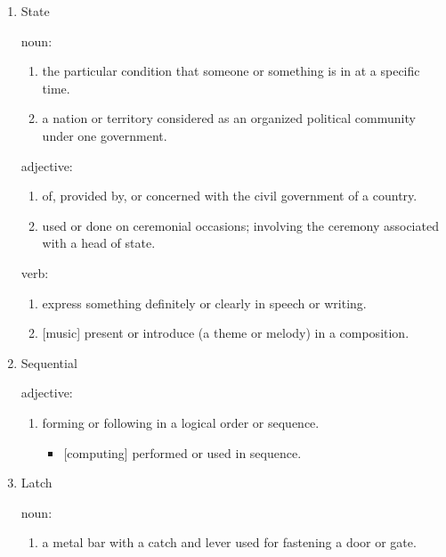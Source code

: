 \documentclass[12pt]{article}
\begin{document}
\begin{enumerate}
  \item State

  noun:

  \begin{enumerate}
    \item the particular condition that someone or something is in at a specific time.
    \item a nation or territory considered as an organized political community under one government.
  \end{enumerate}

  adjective:

  \begin{enumerate}
    \item of, provided by, or concerned with the civil government of a country.
    \item used or done on ceremonial occasions; involving the ceremony associated with a head of state.
  \end{enumerate}

  verb:

  \begin{enumerate}
    \item express something definitely or clearly in speech or writing.
    \item {[music]} present or introduce (a theme or melody) in a composition.
  \end{enumerate}

  \item Sequential

  adjective:

  \begin{enumerate}
    \item forming or following in a logical order or sequence.

    \begin{itemize}
      \item {[computing]} performed or used in sequence.
    \end{itemize}
  \end{enumerate}

  \item{Latch}

  noun:

  \begin{enumerate}
    \item a metal bar with a catch and lever used for fastening a door or gate.
  \end{enumerate}


\end{enumerate}
\end{document}
